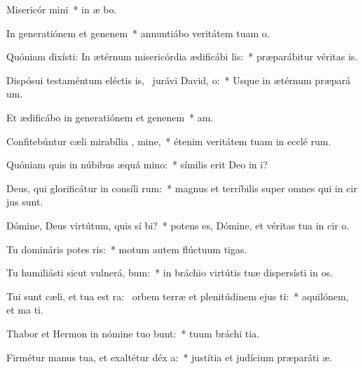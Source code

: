 \item Misericór mini~* in æ bo.
\item In generatiónem et genenem~* annuntiábo veritátem tuam   o.
\item Quóniam dixísti: In ætérnum misericórdia ædificábi  lis:~* præparábitur véritas   is.
\item Dispósui testaméntum eléctis is,~\pscross{} jurávi David,  o:~* Usque in ætérnum præpará  um.
\item Et ædificábo in generatiónem et genenem~*  am.
\item Confitebúntur cæli mirabília , mine,~* étenim veritátem tuam in ecclé rum.
\item Quóniam quis in núbibus æquá mino:~* símilis erit Deo in  i?
\item Deus, qui glorificátur in consíli rum:~* magnus et terríbilis super omnes qui in cir jus sunt.
\item Dómine, Deus virtútum, quis sí bi?~* potens es, Dómine, et véritas tua in cir o.
\item Tu domináris potes ris:~* motum autem flúctuum   tigas.
\item Tu humiliásti sicut vulnerá, bum:~* in bráchio virtútis tuæ dispersísti in os.
\item Tui sunt cæli, et tua est ra:~\pscross{} orbem terræ et plenitúdinem ejus  ti:~* aquilónem, et ma  ti.
\item Thabor et Hermon in nómine tuo bunt:~* tuum bráchi  tia.
\item Firmétur manus tua, et exaltétur déx a:~* justítia et judícium præparáti  æ.

